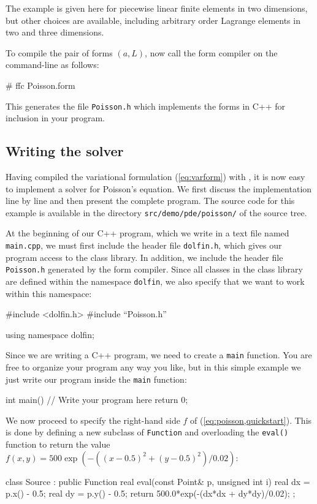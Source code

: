 The example is given here for piecewise linear finite elements in two
dimensions, but other choices are available, including arbitrary order
Lagrange elements in two and three dimensions.

To compile the pair of forms $(a, L)$, now call the form compiler on
the command-line as follows:
\begin{code}
# ffc Poisson.form
\end{code}
This generates the file \texttt{Poisson.h} which implements the forms
in C++ for inclusion in your \dolfin{} program.

\subsection{Writing the solver}

Having compiled the variational formulation (\ref{eq:varform})
with \ffc{}, it is now easy to implement a solver for Poisson's
equation. We first discuss the implementation line by line and then
present the complete program. The source code for this example is
available in the directory \texttt{src/demo/pde/poisson/} of the \dolfin{}
source tree.

At the beginning of our C++ program, which we write in a text file
named \texttt{main.cpp}, we must first include the header file
\texttt{dolfin.h}, which gives our program access to the \dolfin{}
class library. In addition, we include the header file
\texttt{Poisson.h} generated by the form compiler. Since all classes
in the \dolfin{} class library are defined within the namespace
\texttt{dolfin}, we also specify that we want to work within this
namespace:
\begin{code}
#include <dolfin.h>
#include ``Poisson.h''
  
using namespace dolfin;
\end{code}

Since we are writing a C++ program, we need to create a \texttt{main}
function.  You are free to organize your program any way you like, but
in this simple example we just write our program inside the
\texttt{main} function:

\begin{code}
int main()
{
  // Write your program here
  return 0;
}
\end{code}

We now proceed to specify the right-hand side $f$ of (\ref{eq:poisson,quickstart}).
This is done by defining a new subclass of \texttt{Function}
and overloading the \texttt{eval()}
function to return the value $f(x, y) = 500 \exp(-((x-0.5)^2 +
(y-0.5)^2)/0.02)$:
\begin{code}
class Source : public Function
{
  real eval(const Point& p, unsigned int i)
 {
    real dx = p.x() - 0.5;
    real dy = p.y() - 0.5;
    return 500.0*exp(-(dx*dx + dy*dy)/0.02);
  }
};
\end{code}


